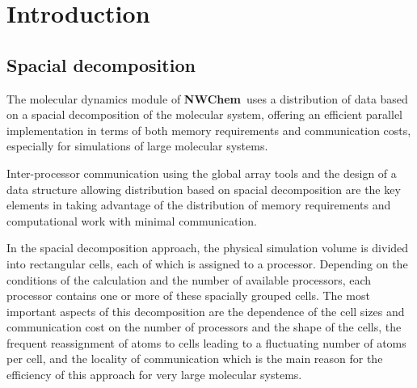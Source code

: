 \label{sec:nwmd}
\newcommand{\mc}[3]{\mbox{\bf #3}}
\newcommand{\vb}[1]{\mbox{\verb.#1.}}
\newcommand{\none}{\multicolumn{2}{|c|}{ }}
\newcommand{\mcc}[1]{\multicolumn{2}{c}{#1}}
\def\bmu{\mbox{\boldmath $\mu$}}
\def\bE{\mbox{\bf E}}
\def\br{\mbox{\bf r}}
\def\tT{\tilde{T}}
\def\t{\tilde{1}}
\def\ip{i\prime}
\def\jp{j\prime}
\def\ipp{i\prime\prime}
\def\jpp{j\prime\prime}
\def\etal{{\sl et al.}}
\def\nwchem{{\bf NWChem}}
\def\prepare{{\bf prepare}}
\def\nwtop{{\bf nwtop}}
\def\nwrst{{\bf nwrst}}
\def\nwsgm{{\bf nwsgm}}

\section{Introduction}

\subsection{Spacial decomposition}
The molecular dynamics module of \nwchem\ uses a distribution of data
based on a spacial decomposition of the molecular system, offering
an efficient parallel implementation in terms of both memory 
requirements and communication costs, especially for simulations of 
large molecular systems.

Inter-processor communication using the global array tools and the
design of a data structure allowing distribution based on spacial
decomposition are the key elements in taking advantage of
the distribution of memory requirements and computational work with
minimal communication.

In the spacial decomposition approach, the physical simulation
volume is divided into rectangular cells, each of which is
assigned to a processor. Depending on the conditions of the 
calculation and the number of available processors, each processor 
contains one or more of these spacially grouped cells.
The most important aspects of this decomposition are the dependence 
of the cell sizes and communication cost on the number of processors 
and the shape of the cells, the frequent reassignment of atoms to 
cells leading to a fluctuating number of atoms per cell, and the 
locality of communication which is the main reason for the efficiency 
of this approach for very large molecular systems.

